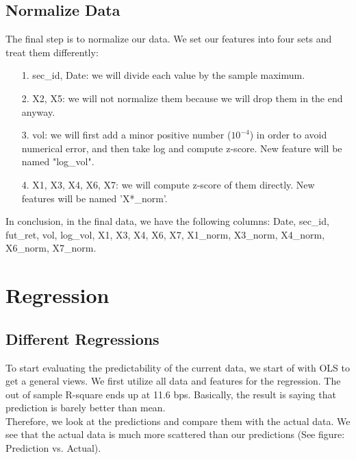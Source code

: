 \documentclass[onecolumn]{article}
\begin{document}
\subsection{Normalize Data}
The final step is to normalize our data. We set our features into four sets and treat them differently:
\begin{itemize}
    \item[1.] sec\_id, Date: we will divide each value by the sample maximum.
    \item[2.] X2, X5: we will not normalize them because we will drop them in the end anyway.
    \item[3.] vol: we will first add a minor positive number ($10^{-4}$) in order to avoid numerical error, and then take log and compute z-score. New feature will be named "log\_vol".
    \item[4.] X1, X3, X4, X6, X7: we will compute z-score of them directly. New features will be named 'X*\_norm'. %
\end{itemize}

\indent In conclusion, in the final data, we have the following columns: Date, sec\_id, fut\_ret, vol, log\_vol, X1, X3, X4, X6, X7, X1\_norm, X3\_norm, X4\_norm, X6\_norm, X7\_norm.



\section{Regression}
\subsection{Different Regressions}
To start evaluating the predictability of the current data, we start of with OLS to get a general views. We first utilize all data and features for the regression. The out of sample R-square ends up at 11.6 bps. Basically, the result is saying that prediction is barely better than mean.\\
\indent Therefore, we look at the predictions and compare them with the actual data. We see that the actual data is much more scattered than our predictions (See figure: Prediction vs. Actual).
\end{document}
